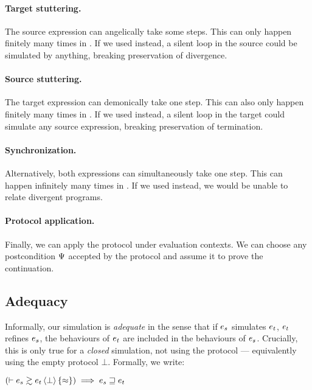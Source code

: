 \paragraph{ Target stuttering.}
The source expression can angelically take some steps.
This can only happen finitely many times in \iSimLfp.
If we used \iSimGfp instead, a silent loop in the source could be simulated by anything, breaking preservation of divergence.

\paragraph{ Source stuttering.}
The target expression can demonically take one step.
This can also only happen finitely many times in \iSimLfp.
If we used \iSimGfp instead, a silent loop in the target could simulate any source expression, breaking preservation of termination.

\paragraph{ Synchronization.}
Alternatively, both expressions can simultaneously take one step.
This can happen infinitely many times in \iSimGfp.
If we used \iSimLfp instead, we would be unable to relate divergent programs.

\paragraph{ Protocol application.}
Finally, we can apply the protocol under evaluation contexts.
We can choose any postcondition $\Psi$ accepted by the protocol and assume it to prove the continuation.

\subsection{Adequacy}



Informally, our simulation is \emph{adequate} in the sense that if $\datalangExpr_s$ simulates $\datalangExpr_t$, $\datalangExpr_t$ refines $\datalangExpr_s$, \ie the behaviours of $\datalangExpr_t$ are included in the behaviours of $\datalangExpr_s$.
Crucially, this is only true for a \emph{closed} simulation, \ie not using the protocol --- equivalently using the empty protocol $\bot$.
Formally, we write:

\begin{lemma} \label{thm:adequacy}
    $
        \left( \vdash \iSimv[\bot]{\iSimilar}{\datalangExpr_s}{\datalangExpr_t} \right) \implies
        \datalangExpr_s \refined \datalangExpr_t
    $
\end{lemma}

